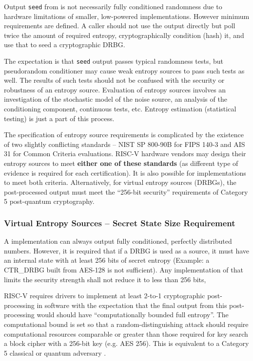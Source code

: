     Output \verb|seed| from  is not necessarily fully
    conditioned randomness due to hardware limitations of smaller,
    low-powered implementations. However minimum requirements are
    defined. A caller should not use the output directly but poll
    twice the amount of required entropy, cryptographically condition
    (hash) it, and use that to seed a cryptographic DRBG.

    The expectation is that \verb|seed| output passes typical randomness
    tests, but pseudorandom conditioner may cause weak entropy sources to
    pass such tests as well. The results of such tests should not be
    confused with the security or robustness of an entropy source.
    Evaluation of entropy sources involves an investigation of the
    stochastic model of the noise source, an analysis of the conditioning
    component, continuous tests, etc. Entropy estimation (statistical
    testing) is just a part of this process.

    The specification of entropy source requirements is complicated by the
    existence of two slightly conflicting standards -- NIST SP 800-90B
    \cite{TuBaKe+18} for FIPS 140-3 and AIS 31 \cite{KiSc11} for Common
    Criteria evaluations. RISC-V hardware vendors may design their entropy
    sources to meet {\bf either one of these standards} (as different type
    of evidence is required for each certification). It is also possible for
    implementations to meet both criteria. Alternatively, for virtual
    entropy sources (DRBGs), the post-processed output must meet the
    ``256-bit security'' requirements of Category 5 post-quantum cryptography.


    \subsubsection{Virtual Entropy Sources -- Secret State Size Requirement}

    A  implementation can always output fully
    conditioned, perfectly distributed numbers. However, it is required
    that if a DRBG is used as a source, it must have an internal state with
    at least 256 bits of secret entropy (Example: a CTR\_DRBG built from
    AES-128 is not sufficient). Any implementation of 
    that limits the security strength shall not reduce it to less than
    256 bits,

    RISC-V requires drivers to implement at least 2-to-1 cryptographic
    post-processing in software with the expectation that the final output
    from this post-processing would should have ``computationally bounded
    full entropy''.  The computational bound is set so that a
    random-distinguishing attack should require computational resources
    comparable or greater than those required for key search a block cipher
    with a 256-bit key (e.g. AES 256). This is equivalent to a Category 5
    classical or quantum adversary
    \cite[Section 4.A.4 Security Strength Categories]{NI16}.


